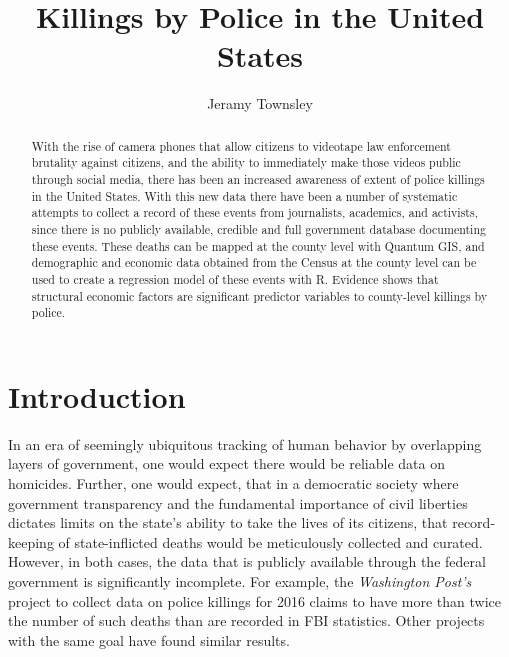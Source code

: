 \documentclass[sigconf]{acmart}
\begin{document}
\title{Killings by Police in the United States}

\author{Jeramy Townsley}


\begin{abstract}
With the rise of camera phones that allow citizens to videotape law enforcement brutality against citizens, and the ability to immediately make those videos public through social media, there has been an increased awareness of extent of police killings in the United States.  With this new data there have been a number of systematic attempts to collect a record of these events from journalists, academics, and activists, since there is no publicly available, credible and full government database documenting these events. These deaths can be mapped at the county level with Quantum GIS, and demographic and economic data obtained from the Census at the county level can be used to create a regression model of these events with R.  Evidence shows that structural economic factors are significant predictor variables to county-level killings by police.
\end{abstract}


\maketitle

\section{Introduction}

In an era of seemingly ubiquitous tracking of human behavior by  overlapping layers of government, one would expect there would be reliable data on homicides. Further, one would expect, that in a democratic society where government transparency and the fundamental importance of civil liberties dictates limits on the state's ability to take the lives of its citizens, that record-keeping of state-inflicted deaths would be meticulously collected and curated. \cite{brucato15} However, in both cases, the data that is publicly available through the federal government is significantly incomplete. \cite{currie16, pridemore05,dalton17,nix17} For example, the {\em Washington Post's} project to collect data on police killings for 2016 claims to have more than twice the number of such deaths than are recorded in FBI statistics. \cite{fatalforce}  Other projects with the same goal have found similar results. \cite{policeviolence,counted} 
\end{document}

